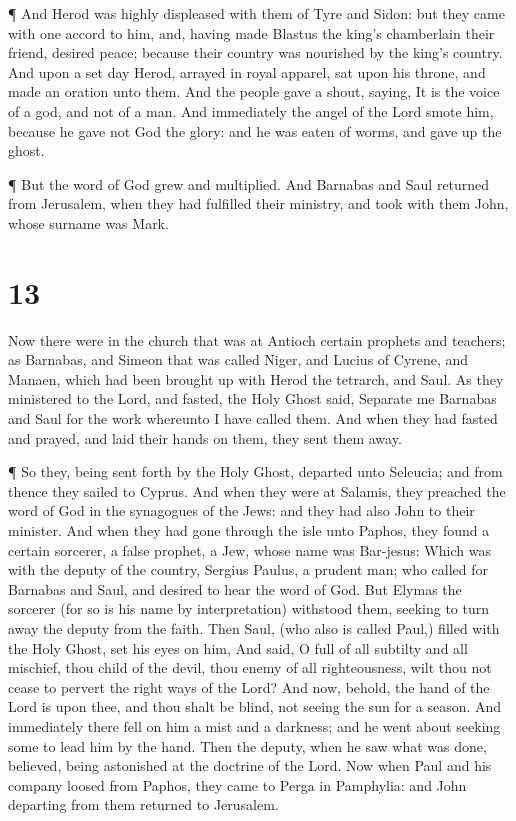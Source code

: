  ¶ And Herod was highly displeased with them of Tyre and
Sidon: but they came with one accord to him, and, having made Blastus
the king's chamberlain their friend, desired peace; because their
country was nourished by the king's country.  And upon a
set day Herod, arrayed in royal apparel, sat upon his throne, and made
an oration unto them.  And the people gave a shout, saying,
It is the voice of a god, and not of a man.  And
immediately the angel of the Lord smote him, because he gave not God the
glory: and he was eaten of worms, and gave up the ghost.

 ¶ But the word of God grew and multiplied. 
And Barnabas and Saul returned from Jerusalem, when they had fulfilled
their ministry, and took with them John, whose surname was Mark.

\hypertarget{section-12}{%
\section{13}\label{section-12}}

 Now there were in the church that was at Antioch certain
prophets and teachers; as Barnabas, and Simeon that was called Niger,
and Lucius of Cyrene, and Manaen, which had been brought up with Herod
the tetrarch, and Saul.  As they ministered to the Lord, and
fasted, the Holy Ghost said, Separate me Barnabas and Saul for the work
whereunto I have called them.  And when they had fasted and
prayed, and laid their hands on them, they sent them away.

 ¶ So they, being sent forth by the Holy Ghost, departed
unto Seleucia; and from thence they sailed to Cyprus.  And
when they were at Salamis, they preached the word of God in the
synagogues of the Jews: and they had also John to their minister.
 And when they had gone through the isle unto Paphos, they
found a certain sorcerer, a false prophet, a Jew, whose name was
Bar-jesus:  Which was with the deputy of the country,
Sergius Paulus, a prudent man; who called for Barnabas and Saul, and
desired to hear the word of God.  But Elymas the sorcerer
(for so is his name by interpretation) withstood them, seeking to turn
away the deputy from the faith.  Then Saul, (who also is
called Paul,) filled with the Holy Ghost, set his eyes on him,
 And said, O full of all subtilty and all mischief, thou
child of the devil, thou enemy of all righteousness, wilt thou not cease
to pervert the right ways of the Lord?  And now, behold,
the hand of the Lord is upon thee, and thou shalt be blind, not seeing
the sun for a season. And immediately there fell on him a mist and a
darkness; and he went about seeking some to lead him by the hand.
 Then the deputy, when he saw what was done, believed,
being astonished at the doctrine of the Lord.  Now when
Paul and his company loosed from Paphos, they came to Perga in
Pamphylia: and John departing from them returned to Jerusalem.

